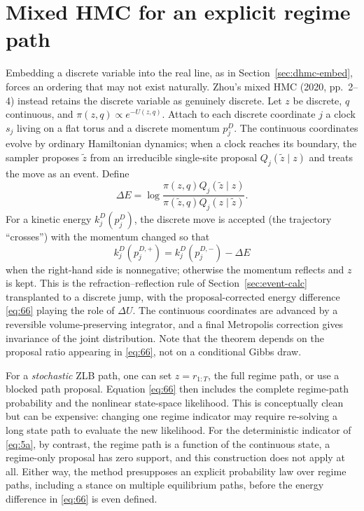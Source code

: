 \documentclass[11pt]{article}
\begin{document}
\section{Mixed HMC for an explicit regime path}\label{sec:mixed}

Embedding a discrete variable into the real line, as in
Section~\ref{sec:dhmc-embed}, forces an ordering that may not exist
naturally. Zhou's mixed HMC (2020, pp.~2--4) instead retains the discrete
variable as genuinely discrete. Let $z$ be discrete, $q$ continuous, and
$\pi(z,q)\propto e^{-U(z,q)}$. Attach to each discrete coordinate $j$ a
clock $s_j$ living on a flat torus and a discrete momentum $p_j^D$. The
continuous coordinates evolve by ordinary Hamiltonian dynamics; when a clock
reaches its boundary, the sampler proposes $\widetilde z$ from an
irreducible single-site proposal $Q_j(\widetilde z\mid z)$ and treats the
move as an event. Define
\begin{equation}\label{eq:66}
 \Delta E=\log\frac{\pi(z,q)Q_j(\widetilde z\mid z)}
                         {\pi(\widetilde z,q)Q_j(z\mid\widetilde z)}.
\end{equation}
For a kinetic energy $k_j^D(p_j^D)$, the discrete move is accepted (the
trajectory ``crosses'') with the momentum changed so that
\begin{equation}\label{eq:67}
 k_j^D(p_j^{D,+})=k_j^D(p_j^{D,-})-\Delta E
\end{equation}
when the right-hand side is nonnegative; otherwise the momentum reflects
and $z$ is kept. This is the refraction--reflection rule of
Section~\ref{sec:event-calc} transplanted to a discrete jump, with the
proposal-corrected energy difference \eqref{eq:66} playing the role of
$\Delta U$. The continuous coordinates are advanced by a reversible
volume-preserving integrator, and a final Metropolis correction gives
invariance of the joint distribution. Note that the theorem depends on the
proposal ratio appearing in \eqref{eq:66}, not on a conditional Gibbs draw.

For a \emph{stochastic} ZLB path, one can set $z=r_{1:T}$, the full regime
path, or use a blocked path proposal. Equation \eqref{eq:66} then includes
the complete regime-path probability and the nonlinear state-space
likelihood. This is conceptually clean but can be expensive: changing one
regime indicator may require re-solving a long state path to evaluate the
new likelihood. For the deterministic indicator of \eqref{eq:5a}, by
contrast, the regime path is a function of the continuous state, a
regime-only proposal has zero support, and this construction does not apply
at all. Either way, the method presupposes an explicit probability law over
regime paths, including a stance on multiple equilibrium paths, before
the energy difference in \eqref{eq:66} is even defined.
\end{document}
